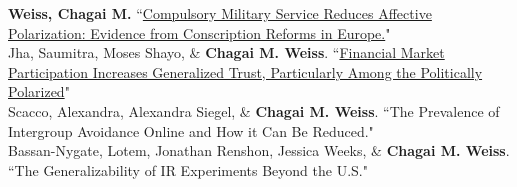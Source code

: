 \documentclass[11pt]{article}
\begin{document}
\textbf{Weiss, Chagai M.} ``\href{https://www.chagaiweiss.com/papers/inprogress/weiss_conscription.pdf}{Compulsory Military Service Reduces Affective Polarization: Evidence from Conscription Reforms in Europe.}" \\


Jha, Saumitra, Moses Shayo, \& \textbf{Chagai M. Weiss}. ``\href{https://papers.ssrn.com/sol3/papers.cfm?abstract_id=4399612}{Financial Market Participation Increases Generalized Trust, Particularly Among the Politically Polarized}" \\



Scacco, Alexandra, Alexandra Siegel, \& \textbf{Chagai M. Weiss}. ``The Prevalence of Intergroup Avoidance Online and How it Can Be Reduced."\\

Bassan-Nygate, Lotem, Jonathan Renshon, Jessica Weeks, \& \textbf{Chagai M. Weiss}. ``The Generalizability of IR Experiments Beyond the U.S." 
 
 

               

 
     
\end{document}
